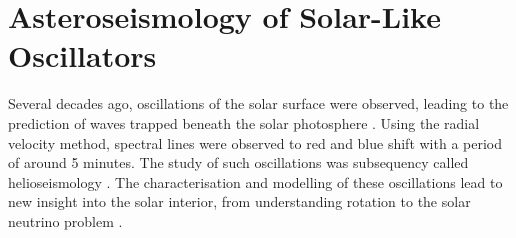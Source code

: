 %
%
%
%
%
\chapter[Asteroseismology]{Asteroseismology of Solar-Like Oscillators}

Several decades ago, oscillations of the solar surface were observed, leading to the prediction of waves trapped beneath the solar photosphere \citep{Ulrich1970}. Using the radial velocity method, spectral lines were observed to red and blue shift with a period of around 5 minutes. The study of such oscillations was subsequency called helioseismology \citep{Deubner.Gough1984}. The characterisation and modelling of these oscillations lead to new insight into the solar interior, from understanding rotation \citep{Deubner.Ulrich.ea1979} to the solar neutrino problem \citep{Bahcall.Ulrich1988}.



